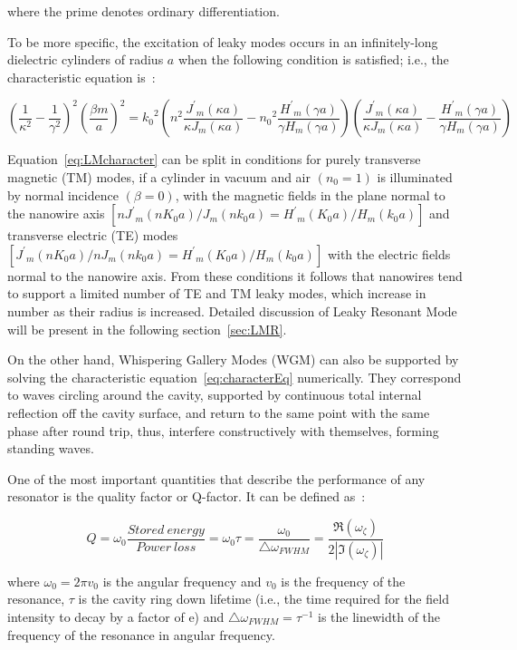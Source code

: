 where the prime denotes ordinary differentiation.

To be more specific, the excitation of leaky modes occurs in an infinitely-long
dielectric cylinders of radius $a$ when the following condition is satisfied;
i.e., the characteristic equation is~\cite{Cao:2009ho}:

\begin{equation}
  {(\frac{1}{\kappa^2}-\frac{1}{\gamma^2})}^2{(\frac{\beta{m}}{a})}^2={k_0}^2(n^2\frac{{J^\prime}_m(\kappa{a})}{\kappa{J_m}(\kappa{a})}-{n_0}^2\frac{{H^\prime}_m(\gamma{a})}{\gamma{H_m}(\gamma{a})})(\frac{{J^\prime}_m(\kappa{a})}{\kappa{J_m}(\kappa{a})}-\frac{{H^\prime}_m(\gamma{a})}{\gamma{H_m}(\gamma{a})})
  \label{eq:LMcharacter}
\end{equation}

Equation~\ref{eq:LMcharacter} can be split in conditions for purely transverse
magnetic (TM) modes, if a cylinder in vacuum and air $(n_0=1)$ is illuminated
by normal incidence $(\beta=0)$, with the magnetic fields in the plane normal
to the nanowire axis
$[n{J^\prime}_m(nK_0a)/J_m(nk_0a)={H^\prime}_m(K_0a)/H_m(k_0a)]$ and transverse
electric (TE) modes
$[{J^\prime}_m(nK_0a)/nJ_m(nk_0a)={H^\prime}_m(K_0a)/H_m(k_0a)]$ with the
electric fields normal to the nanowire axis. From these conditions it follows
that nanowires tend to support a limited number of TE and TM leaky modes, which
increase in number as their radius is increased. Detailed discussion of Leaky
Resonant Mode will be present in the following section~\ref{sec:LMR}.

On the other hand, Whispering Gallery Modes (WGM) can also be supported by
solving the characteristic equation~\ref{eq:characterEq} numerically. They
correspond to waves circling around the cavity, supported by continuous total
internal reflection off the cavity surface, and return to the same point with
the same phase after round trip, thus, interfere constructively with
themselves, forming standing waves.

One of the most important quantities that describe the performance of any
resonator is the quality factor or Q-factor. It can be defined
as~\cite{tobing2010fundamental}:

\begin{equation}
  Q=\omega_0 \frac{Stored\ energy}{Power\ loss}=\omega_0\tau=\frac{\omega_0}{\triangle\omega_{FWHM}}=\frac{\Re(\omega_\zeta)}{2|\Im(\omega_\zeta)|}
  \label{eq:Qfactor}
\end{equation}

where $\omega_0=2\pi{v_0}$ is the angular frequency and $v_0$ is the frequency
of the resonance, $\tau$ is the cavity ring down lifetime (i.e., the time
required for the field intensity to decay by a factor of e) and
$\triangle\omega_{FWHM}={\tau}^{-1}$ is the linewidth of the frequency of the
resonance in angular frequency.

